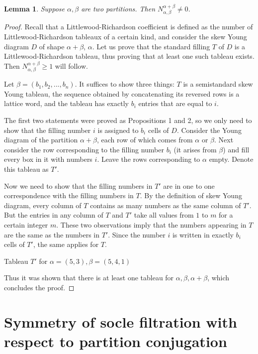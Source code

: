 \documentclass[letterpaper,11pt]{article}
\newtheorem{lemma}{Lemma}
\begin{document}
	\begin{lemma}
		Suppose $\alpha, \beta$ are two partitions. Then $N_{\alpha, \beta}^{\alpha + \beta} \not = 0$.
	\end{lemma}
	\begin{proof}
		Recall that a Littlewood-Richardson coefficient is defined as the number of Littlewood-Richardson tableaux of a certain kind, and consider the skew Young diagram $D$ of shape $\alpha + \beta$, $\alpha$. Let us prove that the standard filling $T$ of $D$ is a Littlewood-Richardson tableau, thus proving that at least one such tableau exists. Then $N_{\alpha, \beta}^{\alpha + \beta} \geq 1$ will follow. 
		
		Let $\beta = (b_1, b_2, ..., b_n)$. It suffices to show three things: $T$ is a semistandard skew Young tableau, the sequence obtained by concatenating its reversed rows is a lattice word, and the tableau has exactly $b_i$ entries that are equal to $i$.
		
		The first two statements were proved as Propositions 1 and 2, so we only need to show that  the filling number $i$ is assigned to $b_i$ cells of $D$. Consider the Young diagram of the partition $\alpha + \beta$, each row of which comes from $\alpha$ or $\beta$. Next consider the row  corresponding to the filling number $b_i$ (it arises from $\beta$) and fill every box in it with numbers $i$. Leave the rows corresponding to $\alpha$ empty. Denote this tableau as $T'$.
		
		Now we need to show that the filling numbers in $T'$ are in one to one correspondence with the filling numbers in $T$. By the definition of skew Young diagram, every column of $T$ contains as many numbers as the same column of $T'$. But the entries in any column of $T$ and $T'$ take all values from $1$ to $m$ for a certain integer $m$. These two observations imply that the numbers appearing in $T$ are the same as the numbers in $T'$. Since the number $i$ is written in exactly $b_i$ cells of $T'$, the same applies for $T$.
		
		{
			 \newline
			Tableau $T'$ for $\alpha = (5,3), \beta=(5,4,1)$ \newline\par
		}
		Thus it was shown that there is at least one tableau for $\alpha, \beta, \alpha + \beta$, which concludes the proof.
	\end{proof}
	
	\section{Symmetry of socle filtration with respect to partition conjugation} \label{sec-struct}
	
\end{document}
